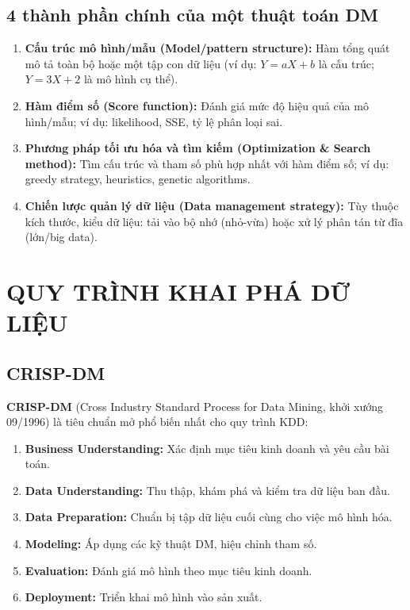 \documentclass[10pt]{article}
\begin{document}
\subsection{4 thành phần chính của một thuật toán DM}

\begin{enumerate}
    \item \textbf{Cấu trúc mô hình/mẫu (Model/pattern structure):} Hàm tổng quát mô tả toàn bộ hoặc một tập con dữ liệu (ví dụ: $Y = aX + b$ là cấu trúc; $Y = 3X + 2$ là mô hình cụ thể).
    \item \textbf{Hàm điểm số (Score function):} Đánh giá mức độ hiệu quả của mô hình/mẫu; ví dụ: likelihood, SSE, tỷ lệ phân loại sai.
    \item \textbf{Phương pháp tối ưu hóa và tìm kiếm (Optimization \& Search method):} Tìm cấu trúc và tham số phù hợp nhất với hàm điểm số; ví dụ: greedy strategy, heuristics, genetic algorithms.
    \item \textbf{Chiến lược quản lý dữ liệu (Data management strategy):} Tùy thuộc kích thước, kiểu dữ liệu: tải vào bộ nhớ (nhỏ-vừa) hoặc xử lý phân tán từ đĩa (lớn/big data).
\end{enumerate}

\section{QUY TRÌNH KHAI PHÁ DỮ LIỆU}

\subsection{CRISP-DM}

\textbf{CRISP-DM} (Cross Industry Standard Process for Data Mining, khởi xướng 09/1996) là tiêu chuẩn mở phổ biến nhất cho quy trình KDD:
\begin{enumerate}
    \item \textbf{Business Understanding:} Xác định mục tiêu kinh doanh và yêu cầu bài toán.
    \item \textbf{Data Understanding:} Thu thập, khám phá và kiểm tra dữ liệu ban đầu.
    \item \textbf{Data Preparation:} Chuẩn bị tập dữ liệu cuối cùng cho việc mô hình hóa.
    \item \textbf{Modeling:} Áp dụng các kỹ thuật DM, hiệu chỉnh tham số.
    \item \textbf{Evaluation:} Đánh giá mô hình theo mục tiêu kinh doanh.
    \item \textbf{Deployment:} Triển khai mô hình vào sản xuất.
\end{enumerate}
\end{document}

